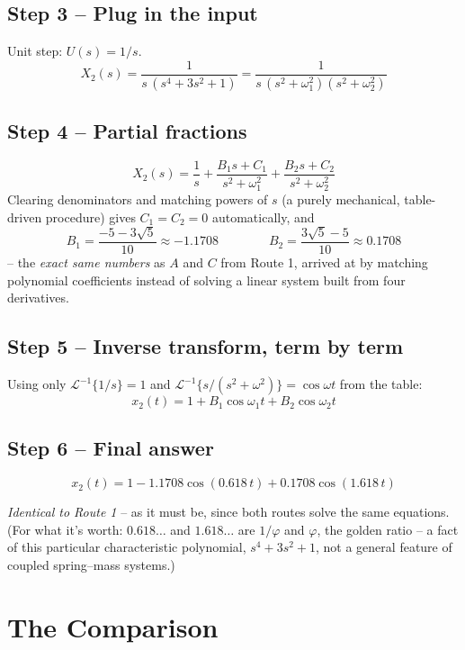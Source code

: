 \documentclass[11pt]{article}
\begin{document}
\subsection*{Step 3 -- Plug in the input}

Unit step: $U(s) = 1/s$.
\[
X_2(s) = \frac{1}{s\,(s^4+3s^2+1)} = \frac{1}{s\,(s^2+\omega_1^2)(s^2+\omega_2^2)}
\]

\subsection*{Step 4 -- Partial fractions}

\[
X_2(s) = \frac{1}{s} + \frac{B_1 s + C_1}{s^2+\omega_1^2} + \frac{B_2 s + C_2}{s^2+\omega_2^2}
\]
Clearing denominators and matching powers of $s$ (a purely mechanical,
table-driven procedure) gives $C_1=C_2=0$ automatically, and
\[
B_1 = \frac{-5-3\sqrt5}{10} \approx -1.1708 \qquad\qquad
B_2 = \frac{3\sqrt5-5}{10} \approx 0.1708
\]
-- the \emph{exact same numbers} as $A$ and $C$ from Route 1, arrived at
by matching polynomial coefficients instead of solving a linear system
built from four derivatives.

\subsection*{Step 5 -- Inverse transform, term by term}

Using only $\mathcal L^{-1}\{1/s\}=1$ and
$\mathcal L^{-1}\{s/(s^2+\omega^2)\}=\cos\omega t$ from the table:
\[
x_2(t) = 1 + B_1\cos\omega_1 t + B_2\cos\omega_2 t
\]

\subsection*{Step 6 -- Final answer}

\begin{tcolorbox}[answerbox]
\[
x_2(t) = 1 - 1.1708\cos(0.618\,t) + 0.1708\cos(1.618\,t)
\]
\end{tcolorbox}

\emph{Identical to Route 1} -- as it must be, since both routes solve the
same equations. (For what it's worth: $0.618\ldots$ and $1.618\ldots$ are
$1/\varphi$ and $\varphi$, the golden ratio -- a fact of this particular
characteristic polynomial, $s^4+3s^2+1$, not a general feature of coupled
spring--mass systems.)

\newpage
\section*{The Comparison}
\end{document}

